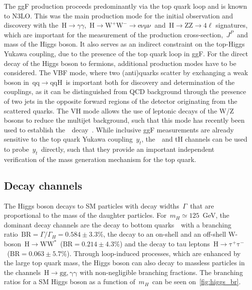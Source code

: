 The ggF production proceeds predominantly via the top quark loop and is known to N3LO. This was the main production mode for the initial observation and discovery with the~$\mathrm{H} \rightarrow \gamma \gamma$,~$\mathrm{H} \rightarrow \mathrm{W}^+\mathrm{W}^- \rightarrow \mathrm{e} \mathrm{\nu} \mathrm{\mu} \mathrm{\nu}$~and~$\mathrm{H} \rightarrow \mathrm{Z}\mathrm{Z} \rightarrow 4\ell$ signatures, which are important for the measurement of the production cross-section,~$J^P$~and mass of the Higgs boson. It also serves as an indirect constraint on the top-Higgs Yukawa coupling, due to the presence of the top quark loop in ggF. For the direct decay of the Higgs boson to fermions, additional production modes have to be considered. The VBF mode, where two (anti)quarks scatter by exchanging a weak boson in~$\mathrm{qq} \rightarrow \mathrm{qqH}$~is important both for discovery and determination of the couplings, as it can be distinguished from QCD background through the presence of two jets in the opposite forward regions of the detector originating from the scattered quarks. The VH mode allows the use of leptonic decays of the W/Z bosons to reduce the multijet background, such that this mode has recently been used to establish the~\Hbb~decay~\cite{Aaboud:2017xsd}. While inclusive ggF measurements are already sensitive to the top quark Yukawa coupling~$y_t$, the~\ttH~and tH channels can be used to probe~$y_t$~directly, such that they provide an important independent verification of the mass generation mechanism for the top quark.

\subsection{Decay channels}
The Higgs boson decays to SM particles with decay widths~$\Gamma$~that are proportional to the mass of the daughter particles. For~$m_H
\simeq 125$~GeV, the dominant decay channels are the decay to bottom quarks~\Hbb~with a branching ratio~$\mathrm{BR} = \Gamma/\Gamma_{H} = 0.584 \pm 3.3\%$, the decay to an on-shell and an off-shell W-boson~$\mathrm{H}\rightarrow \mathrm{W} \mathrm{W}^*$~($\mathrm{BR} = 0.214\pm4.3\%$) and the decay to tau leptons~$\mathrm{H} \rightarrow \mathrm{\tau}^+ \mathrm{\tau}^-$~($\mathrm{BR} = 0.063 \pm 5.7\%$). Through loop-induced processes, which are enhanced by the large top quark mass, the Higgs boson can also decay to massless particles in the channels~$\mathrm{H} \rightarrow \mathrm{g} \mathrm{g}, \mathrm{\gamma}\mathrm{\gamma}$ with non-negligible branching fractions. The branching ratios for a SM Higgs boson as a function of~$m_H$~can be seen on~\cref{fig:higgs_br}.

